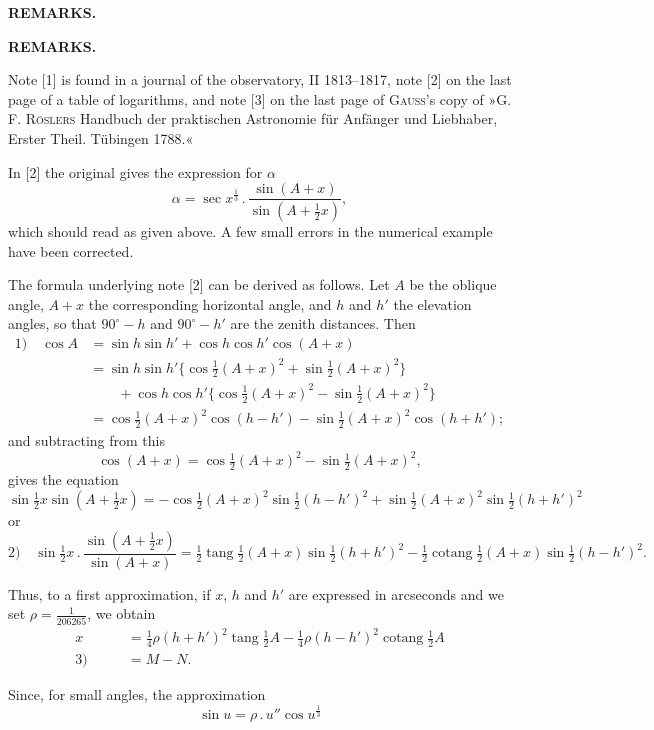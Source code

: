\par\clearpage
\noindent{}\hfill{\small\textbf{REMARKS.}}\hfill\null\par\bigskip
\begingroup\small
\begin{center}\vspace{2cm}\textbf{REMARKS.}\end{center}
\par\noindent\hspace*{\parindent}Note [1] is found in a journal of the observatory, II 1813--1817, note [2] on the last page of a table of logarithms, and note [3] on the last page of \textsc{Gauss}'s copy of »G. F. \textsc{Röslers} Handbuch der praktischen Astronomie für Anfänger und Liebhaber, Erster Theil. Tübingen 1788.«
\par\noindent\hspace*{\parindent}In [2] the original gives the expression for $\alpha$
\[
\alpha=\sec x^{\frac13}\,.\,\frac{\sin(A+x)}{\sin(A+\frac12x)},
\]
\noindent which should read as given above. A few small errors in the numerical example have been corrected.
\par\noindent\hspace*{\parindent}The formula underlying note [2] can be derived as follows. Let $A$ be the oblique angle, $A+x$ the corresponding horizontal angle, and $h$ and $h'$ the elevation angles, so that $90^\circ-h$ and $90^\circ-h'$ are the zenith distances. Then
\[
\begin{aligned}
\text{1)}\quad\cos A&=\sin h\sin h'+\cos h\cos h'\cos(A+x)\\
&=\sin h\sin h'\{\cos\tfrac12(A+x)^2+\sin\tfrac12(A+x)^2\}\\
&\qquad+\cos h\cos h'\{\cos\tfrac12(A+x)^2-\sin\tfrac12(A+x)^2\}\\
&=\cos\tfrac12(A+x)^2\cos(h-h')-\sin\tfrac12(A+x)^2\cos(h+h');
\end{aligned}
\]
\noindent and subtracting from this
\[
\cos(A+x)=\cos\tfrac12(A+x)^2-\sin\tfrac12(A+x)^2,
\]
\noindent gives the equation
\[
\sin\tfrac12x\sin(A+\tfrac12x)=-\cos\tfrac12(A+x)^2\sin\tfrac12(h-h')^2+\sin\tfrac12(A+x)^2\sin\tfrac12(h+h')^2
\]
\noindent or
\[
\text{2)}\quad\sin\tfrac12x\,.\,\frac{\sin(A+\frac12x)}{\sin(A+x)}
=\tfrac12\operatorname{tang}\tfrac12(A+x)\sin\tfrac12(h+h')^2-\tfrac12\operatorname{cotang}\tfrac12(A+x)\sin\tfrac12(h-h')^2.
\]
\par\noindent\hspace*{\parindent}Thus, to a first approximation, if $x$, $h$ and $h'$ are expressed in arcseconds and we set $\rho=\frac1{206265}$, we obtain
\[
\begin{aligned}
x&=\tfrac14\rho(h+h')^2\operatorname{tang}\tfrac12A-\tfrac14\rho(h-h')^2\operatorname{cotang}\tfrac12A\\
\text{3)}\qquad&=M-N.
\end{aligned}
\]
\par\noindent\hspace*{\parindent}Since, for small angles, the approximation
\[
\sin u=\rho\,.\,u''\cos u^{\frac13}
\]
\par\endgroup

